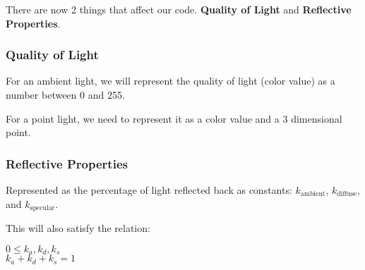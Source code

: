 \documentclass[11pt,fleqn]{article}
\theoremstyle{definition}
\begin{document}
There are now 2 things that affect our code. \textbf{Quality of Light} and
\textbf{Reflective Properties}.

\subsubsection{Quality of Light}

For an ambient light, we will represent the quality of light (color value) as a
number between 0 and 255.

For a point light, we need to represent it as a color value and a 3 dimensional
point.

\subsubsection{Reflective Properties}

Represented as the percentage of light reflected back as constants:
$k_{\text{ambient}}$, $k_{\text{diffuse}}$, and $k_{\text{specular}}$.

This will also satisfy the relation:

\begin{center}
    $0 \leq k_a, k_d, k_s$ \\
    $k_a + k_d + k_s = 1$
\end{center}
\end{document}
